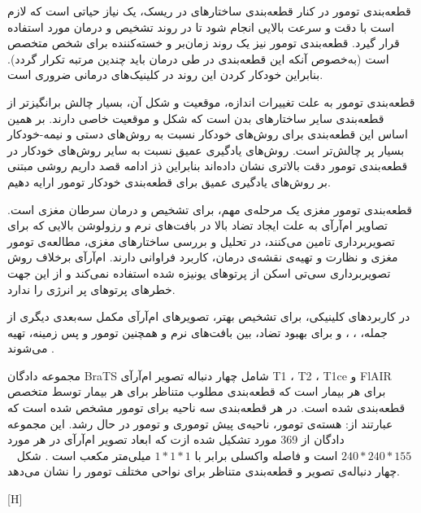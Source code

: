 قطعه‌بندی تومور در کنار قطعه‌بندی ساختارهای در ریسک، یک نیاز حیاتی است که لازم است با دقت و سرعت بالایی انجام شود تا در روند تشخیص و درمان مورد استفاده قرار گیرد. قطعه‌بندی تومور نیز یک روند زمان‌بر و خسته‌کننده برای شخص متخصص است (به‌خصوص آنکه این قطعه‌بندی در طی درمان باید چندین مرتبه تکرار گردد). بنابراین خودکار کردن این روند در کلینیک‌های درمانی ضروری است. 

قطعه‌بندی تومور به علت تغییرات اندازه، موقعیت و شکل آن، بسیار چالش‌ برانگیزتر از قطعه‌بندی سایر ساختارهای بدن است که شکل و موقعیت خاصی دارند. بر همین اساس این قطعه‌بندی برای روش‌های خودکار نسبت به روش‌های دستی و نیمه-خودکار بسیار پر چالش‌تر است. روش‌های یادگیری عمیق نسبت به سایر روش‌های  خودکار در قطعه‌بندی تومور دقت بالاتری نشان‌ داده‌اند بنابراین  ذز ادامه قصد داریم روشی مبتنی بر روش‌های یادگیری عمیق برای قطعه‌بندی خودکار تومور ارایه دهیم.


قطعه‌بندی تومور مغزی یک مرحله‌ی مهم، برای تشخیص و درمان سرطان مغزی است. تصاویر ام‌آرآی به علت ایجاد تضاد بالا در بافت‌های نرم و رزولوشن‌ بالایی که برای تصویربرداری تامین می‌کنند، در تحلیل و بررسی ساختارهای مغزی، مطالعه‌ی تومور مغزی و نظارت و تهیه‌ی نقشه‌ی درمان، کاربرد فراوانی دارند. ام‌آرآی برخلاف روش تصویربرداری سی‌تی اسکن از پرتوهای یونیزه شده استفاده نمی‌کند و از این جهت خطرهای پرتوهای پر انرژی را ندارد. 

در کاربردهای کلینیکی، برای تشخیص بهتر، تصویر‌های ام‌آرآی مکمل سه‌بعدی دیگری از جمله،  ، ، و  برای بهبود تضاد، بین بافت‌های نرم و همچنین تومور و پس زمینه، تهیه می‌شوند .

مجموعه دادگان BraTS  شامل چهار دنباله تصویر ام‌آرآی T1 ، T2 ، T1ce و FlAIR برای هر بیمار است که قطعه‌بندی مطلوب متناظر برای هر بیمار توسط متخصص قطعه‌بندی شده است. در هر قطعه‌بندی سه ناحیه برای تومور مشخص شده است که عبارتند از: هسته‌ی تومور، ناحیه‌ی پیش‌ توموری و تومور در حال رشد. این مجموعه دادگان از 369 مورد تشکیل شده ازت که ابعاد تصویر ام‌آرآی در هر مورد $240*240*155$ است و فاصله واکسلی برابر با $1*1*1$ میلی‌متر مکعب است . شکل ~ چهار دنباله‌ی تصویر و قطعه‌بندی متناظر برای نواحی مختلف تومور را نشان می‌دهد.

[H]

